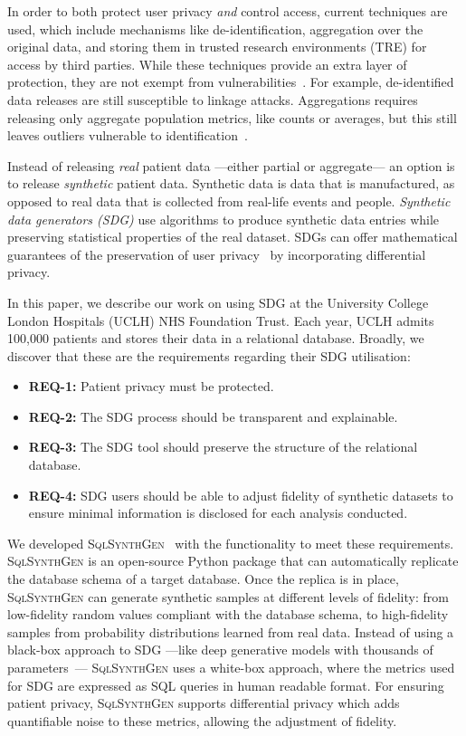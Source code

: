 \documentclass[11pt]{article}
\begin{document}
In order to both protect user privacy \emph{and} control access, current techniques are used, which include mechanisms like de-identification, aggregation over the original data, and storing them in trusted research environments (TRE) for access by third parties. While these techniques provide an extra layer of protection, they are not exempt from vulnerabilities~\cite{near2021}. For example, de-identified data releases are still susceptible to linkage attacks. Aggregations requires releasing only aggregate population metrics, like counts or averages, but this still leaves outliers vulnerable to identification~\cite{tucker2020}. 

Instead of releasing \emph{real} patient data ---either partial or aggregate--- an option is to release \emph{synthetic} patient data. Synthetic data is data that is manufactured, as opposed to real data that is collected from real-life events and people. \emph{Synthetic data generators (SDG)} use algorithms to produce synthetic data entries while preserving statistical properties of the real dataset. SDGs can offer mathematical guarantees of the preservation of user privacy~\cite{Kopp2021MicrosoftSD} by incorporating differential privacy.

In this paper, we describe our work on using SDG at the University College London Hospitals (UCLH) NHS Foundation Trust.
Each year, UCLH admits 100,000 patients and stores their data in a relational database. Broadly, we discover that these are the requirements regarding their SDG utilisation:

\begin{itemize}
  \item \textbf{REQ-1:} Patient privacy must be protected.
  \item \textbf{REQ-2:} The SDG process should be transparent and explainable.
  \item \textbf{REQ-3:} The SDG tool should preserve the structure of the relational database.
  \item \textbf{REQ-4:} SDG users should be able to adjust fidelity of synthetic datasets to ensure minimal information is disclosed for each analysis conducted.
\end{itemize}

We developed \textsc{SqlSynthGen}~\cite{repository} with the functionality to meet these requirements.
\textsc{SqlSynthGen} is an open-source Python package that can automatically replicate the database schema of a target database.
Once the replica is in place, \textsc{SqlSynthGen} can generate synthetic samples at different levels of fidelity: from low-fidelity random values compliant with the database schema, to high-fidelity samples from probability distributions learned from real data.
Instead of using a black-box approach to SDG ---like deep generative models with thousands of parameters~\cite{DBLP:journals/pami/Bond-TaylorLLW22}--- \textsc{SqlSynthGen} uses a white-box approach, where the metrics used for SDG are expressed as SQL queries in human readable format.
For ensuring patient privacy, \textsc{SqlSynthGen} supports differential privacy which adds quantifiable noise to these metrics, allowing the adjustment of fidelity.
\end{document}
